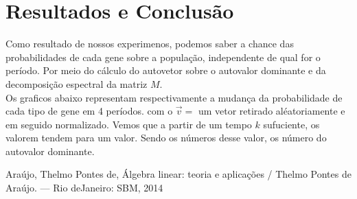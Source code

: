 \documentclass[14pt]{article}
\begin{document}
\section{Resultados e Conclusão}
\label{sec:resultados}

Como resultado de nossos experimenos, podemos saber a chance das probabilidades de cada gene sobre a população, independente de qual for o período. Por meio do cálculo do autovetor sobre o autovalor dominante e da decomposição espectral da matriz $M$.\\

Os graficos abaixo representam respectivamente a mudança da probabilidade de cada tipo de gene em 4 períodos. com o $\vec{v} = $ um vetor retirado aléatoriamente e em seguido normalizado. Vemos que a partir de um tempo $k$ sufuciente, os valorem tendem para um valor. Sendo os números desse valor, os número do autovalor dominante.
$ $\\





% 

Araújo, Thelmo Pontes de, Álgebra linear: teoria e aplicações / Thelmo Pontes de Araújo. — Rio deJaneiro: SBM, 2014
\end{document}

